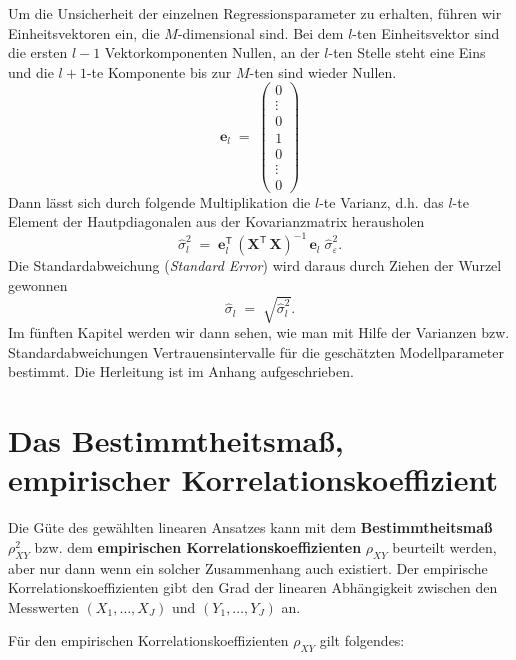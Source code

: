 Um die Unsicherheit der einzelnen Regressionsparameter zu erhalten, führen wir Einheitsvektoren ein, die $M$-dimensional sind.
Bei dem $l$-ten Einheitsvektor sind die ersten $l-1$ Vektorkomponenten Nullen, an der $l$-ten Stelle steht eine Eins
und die $l+1$-te Komponente bis zur $M$-ten sind wieder Nullen.
\begin{equation}
\boldsymbol{e}_l \; = \;
\left(\begin{array}{c}
0\\
\vdots\\
0\\
1\\
0\\
\vdots\\
0
\end{array}\right)
\end{equation}
Dann lässt sich durch folgende Multiplikation die $l$-te Varianz, d.h. das $l$-te Element
der Hautpdiagonalen aus der Kovarianzmatrix herausholen
\begin{equation}
\hat \sigma_l^2 \; = \; \boldsymbol{e}_l^\mathsf{T} \, \left( \mathbf{X}^\mathsf{T}  \, \mathbf{X} \right)^{-1} \, \boldsymbol{e}_l  \; \hat \sigma_{\varepsilon}^2 .
\label{eq:URegressparamsMatrix}
\end{equation}
Die Standardabweichung (\textsl{Standard Error}) wird daraus durch Ziehen der Wurzel
gewonnen
\begin{equation}
\hat \sigma_l \; = \; \sqrt{\hat \sigma_l^2} .
\end{equation}
Im fünften Kapitel werden wir dann sehen, wie man mit Hilfe der Varianzen bzw. Standardabweichungen Vertrauensintervalle für die geschätzten Modellparameter bestimmt.
Die Herleitung ist im Anhang aufgeschrieben.

\newpage
\section{Das Bestimmtheitsmaß, empirischer Korrelationskoeffizient}
Die G\"{u}te des gew\"{a}hlten linearen Ansatzes kann mit dem
\textbf{Bestimmtheitsmaß} $\rho_{XY}^2 $ bzw. dem \textbf{empirischen
	Korrelationskoeffizienten} $\rho_{XY}$ beurteilt werden, aber nur dann
wenn ein solcher Zusammenhang auch existiert. Der empirische
Korrelationskoeffizienten gibt den Grad der linearen
Abh\"{a}ngigkeit zwischen den Messwerten $(X_1 ,\ldots ,X_J )$ und
$(Y_1 ,\ldots ,Y_J)$ an. 

Für den empirischen Korrelationskoeffizienten $\rho_{XY}$ gilt folgendes:

